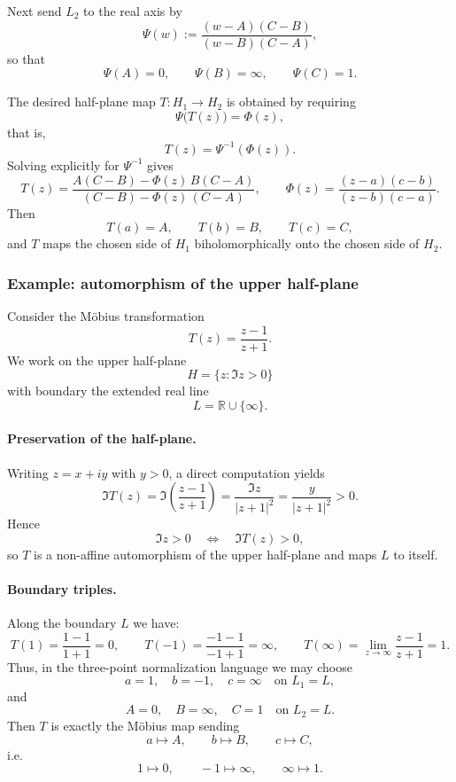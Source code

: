 \documentclass[12pt,a4paper]{article}
\begin{document}
	Next send $L_2$ to the real axis by
	\[
	\Psi(w) := \frac{(w-A)(C-B)}{(w-B)(C-A)},
	\]
	so that
	\[
	\Psi(A) = 0, \qquad \Psi(B) = \infty, \qquad \Psi(C) = 1.
	\]
	
	The desired half-plane map $T : H_1 \to H_2$ is obtained by requiring
	\[
	\Psi\bigl(T(z)\bigr) = \Phi(z),
	\]
	that is,
	\[
	T(z) = \Psi^{-1}(\Phi(z)).
	\]
	Solving explicitly for $\Psi^{-1}$ gives
	\[
	T(z)
	= \frac{A(C-B) - \Phi(z)\,B(C-A)}{(C-B) - \Phi(z)\,(C-A)},
	\qquad
	\Phi(z) = \frac{(z-a)(c-b)}{(z-b)(c-a)}.
	\]
	Then
	\[
	T(a) = A, \qquad T(b) = B, \qquad T(c) = C,
	\]
	and $T$ maps the chosen side of $H_1$ biholomorphically onto the chosen
	side of $H_2$.
	
	\subsubsection*{Example: automorphism of the upper half-plane}
	
	Consider the M\"obius transformation
	\[
	T(z) = \frac{z-1}{z+1}.
	\]
	We work on the upper half-plane
	\[
	H = \{ z : \Im z > 0 \}
	\]
	with boundary the extended real line
	\[
	L = \mathbb R \cup \{\infty\}.
	\]
	
	\paragraph{Preservation of the half-plane.}
	Writing $z=x+iy$ with $y>0$, a direct computation yields
	\[
	\Im T(z)
	= \Im\!\left(\frac{z-1}{z+1}\right)
	= \frac{\Im z}{|z+1|^2}
	= \frac{y}{|z+1|^2} > 0.
	\]
	Hence
	\[
	\Im z > 0 \quad\Longleftrightarrow\quad \Im T(z) > 0,
	\]
	so $T$ is a non-affine automorphism of the upper half-plane and maps
	$L$ to itself.
	
	\paragraph{Boundary triples.}
	Along the boundary $L$ we have:
	\[
	T(1) = \frac{1-1}{1+1} = 0, \qquad
	T(-1) = \frac{-1-1}{-1+1} = \infty, \qquad
	T(\infty) = \lim_{z\to\infty}\frac{z-1}{z+1} = 1.
	\]
	Thus, in the three-point normalization language we may choose
	\[
	a = 1, \quad b = -1, \quad c = \infty
	\quad\text{on } L_1 = L,
	\]
	and
	\[
	A = 0, \quad B = \infty, \quad C = 1
	\quad\text{on } L_2 = L.
	\]
	Then $T$ is exactly the M\"obius map sending
	\[
	a \mapsto A,\qquad b \mapsto B,\qquad c \mapsto C,
	\]
	i.e.
	\[
	1 \mapsto 0,\qquad -1 \mapsto \infty,\qquad \infty \mapsto 1.
	\]
	
\end{document}
